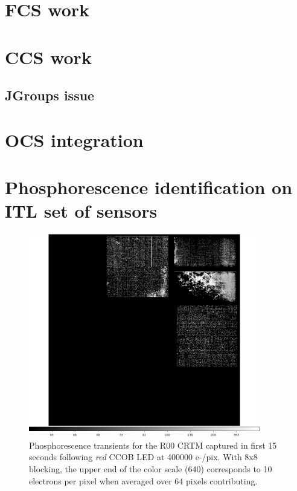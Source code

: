 \appendix

\section{FCS work}

\section{CCS work}
\subsection{JGroups issue}

\section{OCS integration}

\section{Phosphorescence identification on ITL set of sensors}

\begin{figure}[htbp]
\centering
\includegraphics[width=0.9\textwidth]{sections/figures/phosphorescence-survey/itl_fluor_R00_0-19_rb1_log.png}
\caption{Phosphorescence transients for the R00 CRTM captured in first 15 seconds following {\it red} CCOB LED at 400000 e-/pix. With 8x8 blocking, the upper end of the color scale (640) corresponds to 10 electrons per pixel when averaged over 64 pixels contributing.}
\label{fig:phos:R00}
\end{figure}

